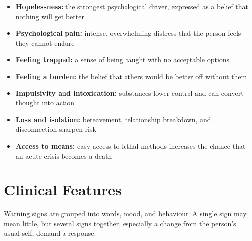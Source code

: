 \begin{itemize}
    \item \textbf{Hopelessness:} the strongest psychological driver, expressed as a belief that nothing will get better
    \item \textbf{Psychological pain:} intense, overwhelming distress that the person feels they cannot endure
    \item \textbf{Feeling trapped:} a sense of being caught with no acceptable options
    \item \textbf{Feeling a burden:} the belief that others would be better off without them
    \item \textbf{Impulsivity and intoxication:} substances lower control and can convert thought into action
    \item \textbf{Loss and isolation:} bereavement, relationship breakdown, and disconnection sharpen risk
    \item \textbf{Access to means:} easy access to lethal methods increases the chance that an acute crisis becomes a death
\end{itemize}

\section*{Clinical Features}
Warning signs are grouped into words, mood, and behaviour. A single sign may mean little, but several signs together, especially a change from the person's usual self, demand a response.

